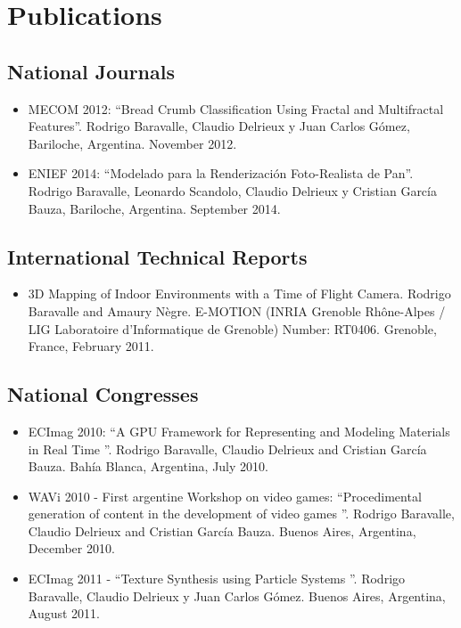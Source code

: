 \documentclass[a4paper,12pt]{article}
\begin{document}
\section*{Publications}
\subsection*{National Journals}

\begin{itemize}
\item MECOM 2012: \textquotedblleft Bread Crumb Classification Using Fractal and Multifractal Features\textquotedblright. Rodrigo Baravalle, Claudio Delrieux y Juan Carlos G\'omez, Bariloche, Argentina. November 2012.
\item ENIEF 2014: \textquotedblleft Modelado para la Renderización Foto-Realista de Pan\textquotedblright. Rodrigo Baravalle, Leonardo Scandolo, Claudio Delrieux y Cristian García Bauza, Bariloche, Argentina. September 2014.
\end{itemize}


\subsection*{International Technical Reports}
\begin{itemize}
\item 3D Mapping of Indoor Environments with a Time of Flight Camera. Rodrigo Baravalle and Amaury N\`egre. E-MOTION (INRIA Grenoble Rh\^one-Alpes /\\ LIG Laboratoire d'Informatique de Grenoble) Number: RT0406. Grenoble, France, February 2011.
\end{itemize}

\subsection*{National Congresses}
\begin{itemize}
\item ECImag 2010: \textquotedblleft A GPU Framework for Representing and Modeling Materials in Real Time \textquotedblright. Rodrigo Baravalle, Claudio Delrieux and Cristian Garc\'ia Bauza. Bahía Blanca, Argentina, July 2010.
\item WAVi 2010 - First argentine Workshop on video games: \textquotedblleft Procedimental generation of content in the development of video games \textquotedblright. Rodrigo Baravalle, Claudio Delrieux and Cristian Garc\'ia Bauza. Buenos Aires, Argentina, December 2010.
\item ECImag 2011 - \textquotedblleft Texture Synthesis using Particle Systems \textquotedblright. Rodrigo Baravalle, Claudio Delrieux y Juan Carlos G\'omez. Buenos Aires, Argentina, August 2011.
\end{itemize}
\end{document}
